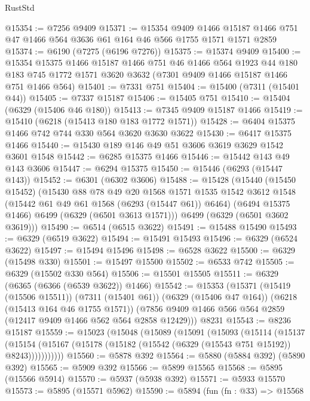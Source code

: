 \begin{lexlean}{RustStd}
\begin{coremodule}
{{@15354 := @7256 @9409
@15371 := @15354
    @9409
    @1466
    @15187
    @1466
    @751
    @47
    @1466
    @564
    @3636
    @61
    @164
    @46
    @566
    @1755
    @1571
    @1571
    @2859
@15374 := @6190 (@7275 (@6196 @7276))
@15375 := @15374 @9409
@15400 := @15354
    @15375
    @1466
    @15187
    @1466
    @751
    @46
    @1466
    @564
    @1923
    @44
    @180
    @183
    @745
    @1772
    @1571
    @3620
    @3632
    (@7301 @9409 @1466 @15187 @1466 @751 @1466 @564)
@15401 := @7331 @751
@15404 := @15400 (@7311 (@15401 @44))
@15405 := @7337 @15187
@15406 := @15405 @751
@15410 := @15404 (@6329 (@15406 @46 @180))
@15413 := @7345 @9409 @15187 @1466
@15419 := @15410 (@6218 (@15413 @180 @183 @1772 @1571))
@15428 := @6404 @15375 @1466 @742 @744 @330 @564 @3620 @3630 @3622
@15430 := @6417 @15375 @1466
@15440 := @15430 @189 @146 @49 @51 @3606 @3619 @3629 @1542 @3601 @1548
@15442 := @6285 @15375 @1466
@15446 := @15442 @143 @49 @143 @3606
@15447 := @6294 @15375
@15450 := @15446 (@6293 (@15447 @143))
@15452 := @6301 (@6302 @3606)
@15488 := @15428
    (@15440
      (@15450 @15452)
      (@15430
        @88
        @78
        @49
        @20
        @1568
        @1571
        @1535
        @1542
        @3612
        @1548
        (@15442 @61 @49 @61 @1568 (@6293 (@15447 @61)) @6464)
        (@6494 @15375 @1466)
        @6499
        (@6329 (@6501 @3613 @1571)))
      @6499
      (@6329 (@6501 @3602 @3619)))
@15490 := @6514 (@6515 @3622)
@15491 := @15488 @15490
@15493 := @6329 (@6519 @3622)
@15494 := @15491 @15493
@15496 := @6329 (@6524 @3622)
@15497 := @15494 @15496
@15498 := @6528 @3622
@15500 := @6329 (@15498 @330)
@15501 := @15497 @15500
@15502 := @6533 @742
@15505 := @6329 (@15502 @330 @564)
@15506 := @15501 @15505
@15511 := @6329 (@6365 (@6366 (@6539 @3622)) @1466)
@15542 := @15353
    (@15371
      (@15419 (@15506 @15511))
      (@7311 (@15401 @61))
      (@6329 (@15406 @47 @164))
      (@6218 (@15413 @164 @46 @1755 @1571))
      (@7856 @9409 @1466 @566 @564 @2859 (@12417 @9409 @1466 @562 @564 @2858 @12429)))
    @8231
@15543 := @8236 @15187
@15559 := @15023
    (@15048
      (@15089
        (@15091
          (@15093
            (@15114
              (@15137
                (@15154
                  (@15167 (@15178 (@15182 (@15542 (@6329 (@15543 @751 @15192)) @8243)))))))))))
@15560 := @5878 @392
@15564 := @5880 (@5884 @392) (@5890 @392)
@15565 := @5909 @392
@15566 := @5899 @15565
@15568 := @5895 (@15566 @5914)
@15570 := @5937 (@5938 @392)
@15571 := @5933 @15570
@15573 := @5895 (@15571 @5962)
@15590 := @5894
    (fun (fn : @33) =>
    @15568
}}
\end{coremodule}
\end{lexlean}
